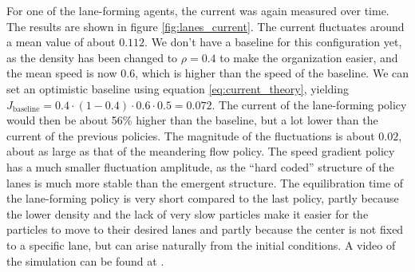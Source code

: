 For one of the lane-forming agents, the current was again measured over time. The results are shown in figure \ref{fig:lanes_current}. The current fluctuates around a mean value of about $0.112$. We don't have a baseline for this configuration yet, as the density has been changed to $\rho=0.4$ to make the organization easier, and the mean speed is now $0.6$, which is higher than the speed of the baseline. We can set an optimistic baseline using equation \ref{eq:current_theory}, yielding $J_{\text{baseline}}=0.4\cdot(1-0.4)\cdot0.6\cdot0.5=0.072$. The current of the lane-forming policy would then be about 56\% higher than the baseline, but a lot lower than the current of the previous policies. The magnitude of the fluctuations is about $0.02$, about as large as that of the meandering flow policy. The speed gradient policy has a much smaller fluctuation amplitude, as the \enquote{hard coded} structure of the lanes is much more stable than the emergent structure. The equilibration time of the lane-forming policy is very short compared to the last policy, partly because the lower density and the lack of very slow particles make it easier for the particles to move to their desired lanes and partly because the center is not fixed to a specific lane, but can arise naturally from the initial conditions. A video of the simulation can be found at \cite{maertens_smarticle_lane_vid_local}.


